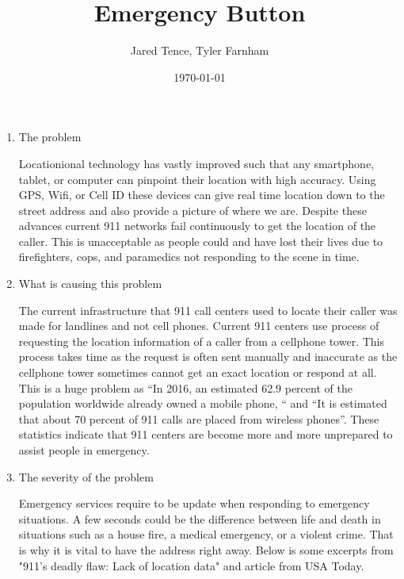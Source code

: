 \documentclass[12pt]{article}
\title{Emergency Button}
\author{Jared Tence, Tyler Farnham}
\date{\today}
\begin{document}
\maketitle

\begin{enumerate}
\item The problem

Locationional technology has vastly improved such that any smartphone, tablet, or computer can pinpoint their location with high accuracy. Using GPS, Wifi, or Cell ID these devices can give real time location down to the street address and also provide a picture of where we are. \cite{Location} Despite these advances current 911 networks fail continuously to get the location of the caller. This is unacceptable as people could and have lost their lives due to firefighters, cops, and paramedics not responding to the scene in time.


\item What is causing this problem

The current infrastructure that 911 call centers used to locate their caller was made for landlines and not cell phones. Current 911 centers use process of requesting the location information of a caller from a cellphone tower. This process takes time as the request is often sent manually and inaccurate as the cellphone tower sometimes cannot get an exact location or respond at all. This is a huge problem as “In 2016, an estimated 62.9 percent of the population worldwide already owned a mobile phone, “ and “It is estimated that about 70 percent of 911 calls are placed from wireless phones”. \cite{text} These statistics indicate that 911 centers are become more and more unprepared to assist people in emergency.


\item The severity of the problem

Emergency services require to be update when responding to emergency situations. A few seconds could be the difference between life and death in situations such as a house fire, a medical emergency, or a violent crime. That is why it is vital to have the address right away. Below is some excerpts from "911's deadly flaw: Lack of location data" and article from USA Today. \cite{flaw}


\end{enumerate}
\end{document}
